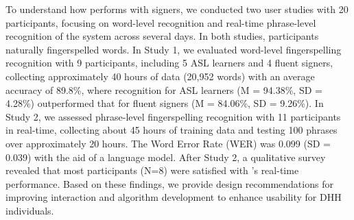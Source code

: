 To understand how \theDevice{} performs with signers, we conducted two user studies with 20 participants, focusing on word-level recognition and real-time phrase-level recognition of the system across several days. In both studies, participants naturally fingerspelled words. In Study 1, we evaluated word-level fingerspelling recognition with 9 participants, including 5 ASL learners and 4 fluent signers, collecting approximately 40 hours of data (20,952 words) with an average accuracy of 89.8\%, where recognition for ASL learners (M = 94.38\%, SD = 4.28\%) outperformed that for fluent signers (M = 84.06\%, SD = 9.26\%). In Study 2, we assessed phrase-level fingerspelling recognition with 11 participants in real-time, collecting about 45 hours of training data and testing 100 phrases over approximately 20 hours. The Word Error Rate (WER) was 0.099 (SD = 0.039) with the aid of a language model. After Study 2, a qualitative survey revealed that most participants (N=8) were satisfied with \theDevice{}’s real-time performance. Based on these findings, we provide design recommendations for improving interaction and algorithm development to enhance usability for DHH individuals.

